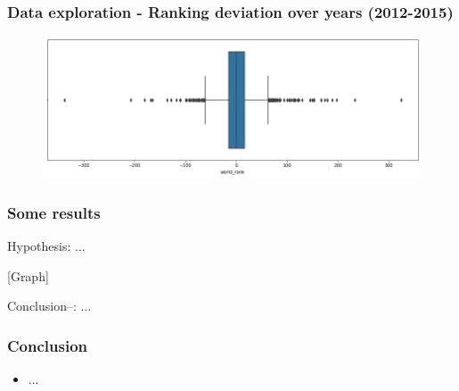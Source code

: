\documentclass[mathserif,notheorems,11pt]{beamer}
\begin{document}
\begin{frame}
\frametitle{Data exploration - Ranking deviation over years (2012-2015)}
\begin{figure}
	\centering
	\includegraphics[width=1\linewidth]{graphs/world_rank_diff_bp}
\end{figure}
\end{frame}



\begin{frame} 
\frametitle{Some results}

Hypothesis: ...

[Graph]

Conclusion--: ...
\end{frame}



\begin{frame} 
\frametitle{Conclusion}
\begin{itemize}
\item ...

\end{itemize}


\end{frame}
\end{document}
